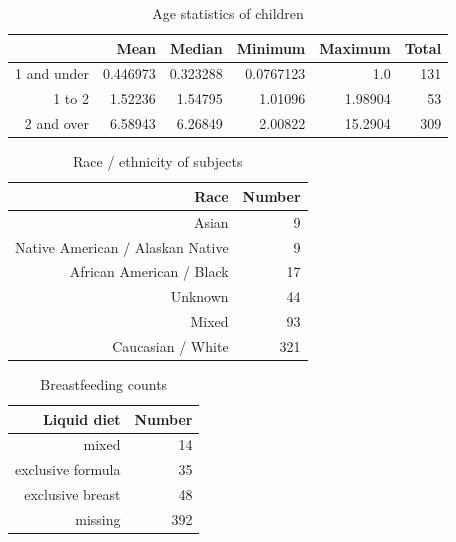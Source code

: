 \documentclass[fleqn,10pt]{wlscirep}
\begin{document}
\begin{table}[ht]
\centering
\begin{tabular}{rrrrrr}
    \hline\hline
    \textbf{ } & \textbf{Mean} & \textbf{Median} & \textbf{Minimum} & \textbf{Maximum} & \textbf{Total} \\\hline
    1 and under & 0.446973 & 0.323288 & 0.0767123 & 1.0 & 131 \\
    1 to 2 & 1.52236 & 1.54795 & 1.01096 & 1.98904 & 53 \\
    2 and over & 6.58943 & 6.26849 & 2.00822 & 15.2904 & 309 \\\hline\hline
\end{tabular}
\caption{
    Age statistics of children
}
\label{tab:agestats}
\end{table}

\begin{table}[ht]
\centering
\begin{tabular}{rr}
    \hline\hline
    \textbf{Race} & \textbf{Number} \\\hline
    Asian  & 9 \\
    Native American / Alaskan Native & 9 \\
    African American / Black & 17 \\
    Unknown & 44 \\
    Mixed & 93 \\
    Caucasian / White & 321 \\\hline\hline
\end{tabular}
\caption{
    Race / ethnicity of subjects
}
\label{tab:race}
\end{table}

\begin{table}[ht]
\centering
\begin{tabular}{rr}
    \hline\hline
    \textbf{Liquid diet} & \textbf{Number} \\\hline
    mixed & 14 \\
    exclusive formula & 35 \\
    exclusive breast & 48 \\
    missing & 392 \\\hline\hline
\end{tabular}
\caption{
    Breastfeeding counts
}
\label{tab:breastfeeding}
\end{table}
\end{document}

